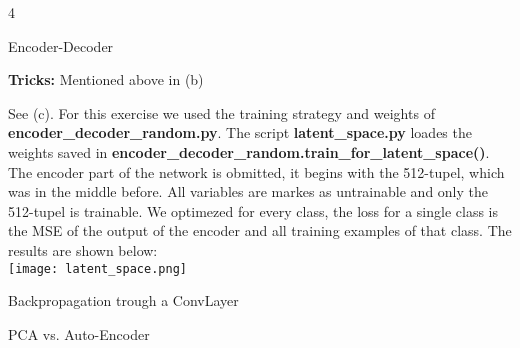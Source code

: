\documentclass{article}
\begin{document}
\begin{ukon-infie}[28.1.18]{4}
\begin{exercise}[p=60]{Encoder-Decoder}
{		\textbf{Tricks:} Mentioned above in (b)
		
		}
		\question{}
		{
		See (c).
		}
		\question{}
		{
		For this exercise we used the training strategy and weights of \textbf{encoder\_decoder\_random.py}. The script \textbf{latent\_space.py} loades the weights saved in \textbf{encoder\_decoder\_random.train\_for\_latent\_space()}. The encoder part of the network is obmitted, it begins with the 512-tupel, which was in the middle before. All variables are markes as untrainable and only the 512-tupel is trainable. We optimezed for every class, the loss for a single class is the MSE of the output of the encoder and all training examples of that class. The results are shown below:\\
		
		\texttt{[image: latent\_space.png]}
		}
		
		\end{exercise}
		
		\begin{exercise}[p=10]{Backpropagation trough a ConvLayer}
		\question{}
		{
		}
		\question{}
		{
			
		}
		
		\end{exercise}
		\begin{exercise}[p=20]{PCA vs. Auto-Encoder}
		\question{}
		{
		}
		\question{}
		{
			
		}
		\question{}
		{
			
		}
		
		\end{exercise}

\end{ukon-infie}
\end{document}
